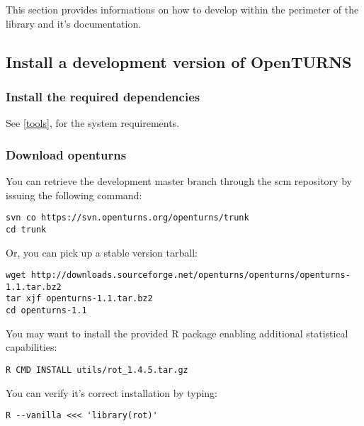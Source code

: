 
This section provides informations on how to develop within the perimeter of the library and it's documentation.


\subsection{Install a development version of OpenTURNS}

\subsubsection{Install the required dependencies}

See \ref{tools}, for the system requirements.

\subsubsection{Download openturns}

You can retrieve the development master branch through the scm repository by issuing the following command:
\begin{lstlisting}
svn co https://svn.openturns.org/openturns/trunk
cd trunk
\end{lstlisting}

Or, you can pick up a stable version tarball:
\begin{lstlisting}
wget http://downloads.sourceforge.net/openturns/openturns/openturns-1.1.tar.bz2
tar xjf openturns-1.1.tar.bz2
cd openturns-1.1
\end{lstlisting}

You may want to install the provided R package enabling additional statistical capabilities:
\begin{lstlisting}
R CMD INSTALL utils/rot_1.4.5.tar.gz
\end{lstlisting}

You can verify it's correct installation by typing:
\begin{lstlisting}
R --vanilla <<< 'library(rot)'
\end{lstlisting}

